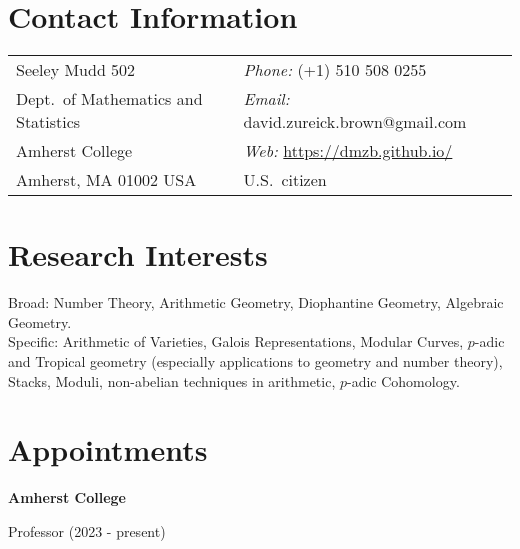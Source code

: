 \documentclass[margin,line]{res}
\newcommand{\defi}[1]{\textsf{#1}} 				%
\newenvironment{list1}{
  \begin{list}{\ding{113}}{%
      \setlength{\itemsep}{0in}
      \setlength{\parsep}{0in} \setlength{\parskip}{0in}
      \setlength{\topsep}{0in} \setlength{\partopsep}{0in}
      \setlength{\leftmargin}{0.17in}}}{\end{list}}
\begin{document}

\begin{resume}
\section{\sc Contact Information}
\vspace{.05in}
\begin{tabular}{@{}p{3in}p{4in}}
Seeley Mudd 502                            & \emph{Phone:} (+1) 510 508 0255 \\
Dept.~of Mathematics and Statistics          & \emph{Email:} david.zureick.brown@gmail.com\\
Amherst College   & \emph{Web:} \url{https://dmzb.github.io/} \\
Amherst, MA 01002 USA               & U.S.~citizen
\end{tabular}



\section{\sc Research Interests}
 \defi{Broad}: Number Theory, Arithmetic Geometry, Diophantine Geometry, Algebraic Geometry.\\
 \defi{Specific}: Arithmetic of Varieties, Galois Representations, Modular Curves, $p$-adic and Tropical geometry (especially applications to geometry and number theory), Stacks, Moduli, non-abelian techniques in arithmetic, $p$-adic Cohomology.

\section{\sc Appointments}

{\bf Amherst College } \\
  \vspace*{-.15in}
  \begin{list1}
  \item[] Professor (2023 - present)


  \end{list1}
\vspace{-7pt}


\end{resume}
\end{document}
